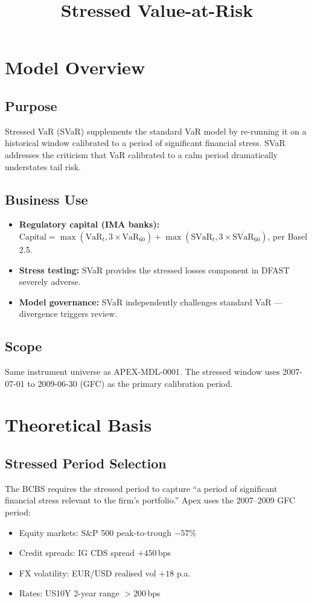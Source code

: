 \documentclass{apex_mdd}
\title{Stressed Value-at-Risk}
\begin{document}
\maketitle
\statusbadge

\tableofcontents
\newpage

\section{Model Overview}

\subsection{Purpose}
Stressed VaR (SVaR) supplements the standard VaR model by re-running it on a historical window calibrated to a period of significant financial stress. SVaR addresses the criticism that VaR calibrated to a calm period dramatically understates tail risk.

\subsection{Business Use}
\begin{itemize}
  \item \textbf{Regulatory capital (IMA banks):} $\mathrm{Capital} = \max(\mathrm{VaR}_t, 3\times\overline{\mathrm{VaR}}_{60}) + \max(\mathrm{SVaR}_t, 3\times\overline{\mathrm{SVaR}}_{60})$, per Basel 2.5.
  \item \textbf{Stress testing:} SVaR provides the stressed losses component in DFAST severely adverse.
  \item \textbf{Model governance:} SVaR independently challenges standard VaR --- divergence triggers review.
\end{itemize}

\subsection{Scope}
Same instrument universe as APEX-MDL-0001. The stressed window uses 2007-07-01 to 2009-06-30 (GFC) as the primary calibration period.

\section{Theoretical Basis}

\subsection{Stressed Period Selection}
The BCBS requires the stressed period to capture ``a period of significant financial stress relevant to the firm's portfolio.'' Apex uses the 2007--2009 GFC period:
\begin{itemize}
  \item Equity markets: S\&P 500 peak-to-trough $-57\%$
  \item Credit spreads: IG CDS spread $+450$\,bps
  \item FX volatility: EUR/USD realised vol $+18$ p.a.
  \item Rates: US10Y 2-year range $>200$\,bps
\end{itemize}
\end{document}
